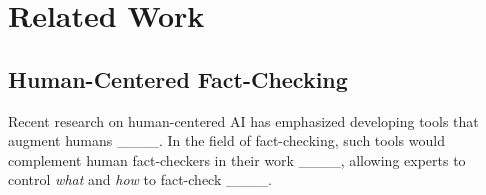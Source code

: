 \section{Related Work}
\subsection{Human-Centered Fact-Checking}
Recent research on human-centered AI has emphasized developing tools that augment humans ____. In the field of fact-checking, such tools would complement human fact-checkers in their work ____, allowing experts to control \emph{what} and \emph{how} to fact-check ____.

